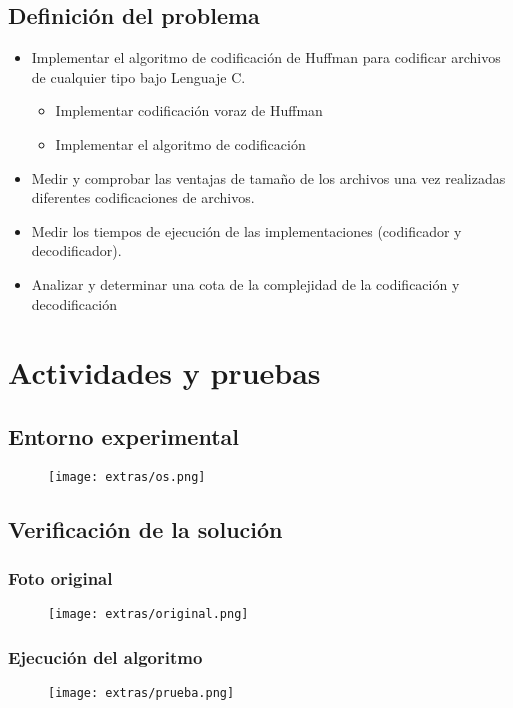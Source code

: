 \documentclass[12 pt]{report}
\begin{document}
\section{Definición del problema}
\begin{itemize}
\item Implementar el algoritmo de codificación de Huffman para codificar archivos de cualquier tipo bajo Lenguaje C.
  \begin{itemize}
  \item Implementar codificación voraz de Huffman
  \item Implementar el algoritmo de codificación
  \end{itemize}
\item Medir y comprobar las ventajas de tamaño de los archivos una vez realizadas diferentes codificaciones de archivos.
\item Medir los tiempos de ejecución de las implementaciones (codificador y decodificador).
\item Analizar y determinar una cota de la complejidad de la codificación y decodificación  
\end{itemize}

\chapter{Actividades y pruebas}
\section{Entorno experimental}
\begin{figure}[h!]
  \centering
  \texttt{[image: extras/os.png]}
  \caption{\label{Entorno experimental usado} }
\end{figure}
\newpage

\section{Verificación de la solución}
\subsection{Foto original}
\begin{figure}[ht]
  \centering
  \texttt{[image: extras/original.png]}
  \caption{\label{fig:Original} }
\end{figure}

\subsection{Ejecución del algoritmo}
\begin{figure}[ht]
  \centering
  \texttt{[image: extras/prueba.png]}
  \caption{\label{fig:Ejecución} }
\end{figure}
\newpage
\end{document}
